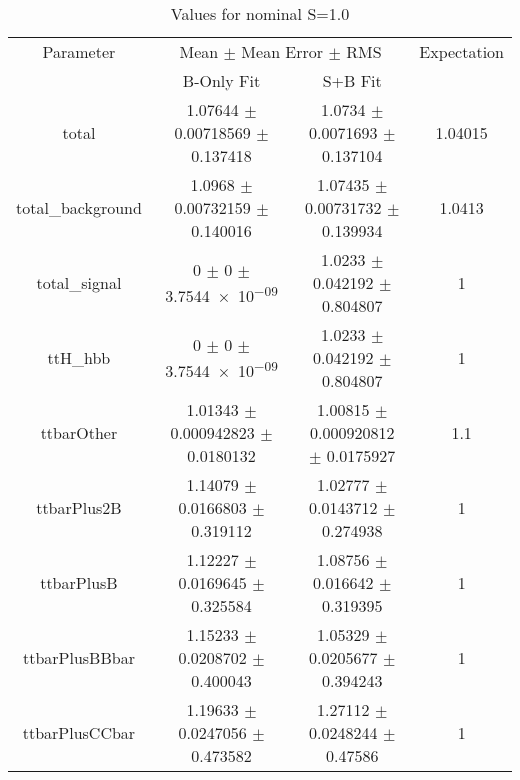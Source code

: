 \begin{table}
\centering
\caption{Values for nominal S=1.0}
\begin{tabular}{cccc}
\toprule
Parameter & \multicolumn{2}{c}{Mean $\pm$ Mean Error $\pm$ RMS} & Expectation\\
 & B-Only Fit & S+B Fit & \\
\midrule
total & \num{1.07644} $\pm$ \num{0.00718569} $\pm$ \num{0.137418} & \num{1.0734} $\pm$ \num{0.0071693} $\pm$ \num{0.137104} & \num{1.04015}\\
total\_background & \num{1.0968} $\pm$ \num{0.00732159} $\pm$ \num{0.140016} & \num{1.07435} $\pm$ \num{0.00731732} $\pm$ \num{0.139934} & \num{1.0413}\\
total\_signal & \num{0} $\pm$ \num{0} $\pm$ \num{3.7544e-09} & \num{1.0233} $\pm$ \num{0.042192} $\pm$ \num{0.804807} & \num{1}\\
ttH\_hbb & \num{0} $\pm$ \num{0} $\pm$ \num{3.7544e-09} & \num{1.0233} $\pm$ \num{0.042192} $\pm$ \num{0.804807} & \num{1}\\
ttbarOther & \num{1.01343} $\pm$ \num{0.000942823} $\pm$ \num{0.0180132} & \num{1.00815} $\pm$ \num{0.000920812} $\pm$ \num{0.0175927} & \num{1.1}\\
ttbarPlus2B & \num{1.14079} $\pm$ \num{0.0166803} $\pm$ \num{0.319112} & \num{1.02777} $\pm$ \num{0.0143712} $\pm$ \num{0.274938} & \num{1}\\
ttbarPlusB & \num{1.12227} $\pm$ \num{0.0169645} $\pm$ \num{0.325584} & \num{1.08756} $\pm$ \num{0.016642} $\pm$ \num{0.319395} & \num{1}\\
ttbarPlusBBbar & \num{1.15233} $\pm$ \num{0.0208702} $\pm$ \num{0.400043} & \num{1.05329} $\pm$ \num{0.0205677} $\pm$ \num{0.394243} & \num{1}\\
ttbarPlusCCbar & \num{1.19633} $\pm$ \num{0.0247056} $\pm$ \num{0.473582} & \num{1.27112} $\pm$ \num{0.0248244} $\pm$ \num{0.47586} & \num{1}\\
\bottomrule
\end{tabular}
\end{table}